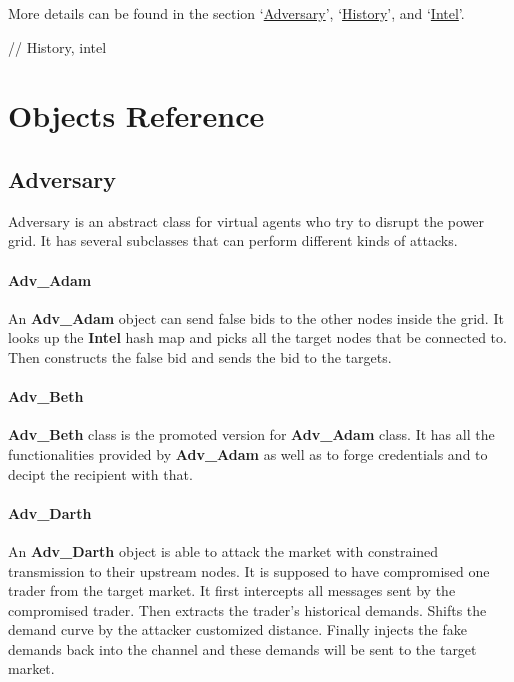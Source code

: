 \documentclass[12pt]{article}
\begin{document}
More details can be found in the section `\hyperref[subsec:objects_adversary]{Adversary}', 
`\hyperref[subsec:objects_history]{History}', and `\hyperref[subsec:objects_intel]{Intel}'. 

// History, intel

\section{Objects Reference}
\label{sec:objects}

\subsection{Adversary} \mbox{}
\label{subsec:objects_adversary}

Adversary is an abstract class for virtual agents who try to disrupt the
power grid. It has several subclasses that can perform different
kinds of attacks.

\paragraph{Adv\_Adam} \mbox{}

An \textbf{Adv\_Adam} object can send false bids to the other nodes inside the grid. 
It looks up the \textbf{Intel} hash map and picks all the target nodes that be 
connected to. Then constructs the false bid and sends the bid to the targets.

\paragraph{Adv\_Beth} \mbox{}

\textbf{Adv\_Beth} class is the promoted version for \textbf{Adv\_Adam} class. It has all 
the functionalities provided by \textbf{Adv\_Adam} as well as to forge credentials 
and to decipt the recipient with that.

\paragraph{Adv\_Darth} \mbox{}

An \textbf{Adv\_Darth} object is able to attack the market with constrained transmission 
to their upstream nodes. It is supposed to have compromised one trader from the 
target market. It first intercepts all messages sent by the compromised trader. 
Then extracts the trader's historical demands. Shifts the demand curve by the attacker 
customized distance. Finally injects the fake demands back into the channel and these 
demands will be sent to the target market. 
\end{document}
